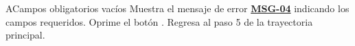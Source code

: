\begin{UCtrayectoriaA}{A}{Campos obligatorios vacíos}
	\UCpaso Muestra el mensaje de error \hyperlink{mMSG04}{\bf MSG-04} indicando los campos requeridos.
	\UCpaso[\UCactor] Oprime el botón .
	\UCpaso Regresa al paso 5 de la trayectoria principal.
\end{UCtrayectoriaA}

